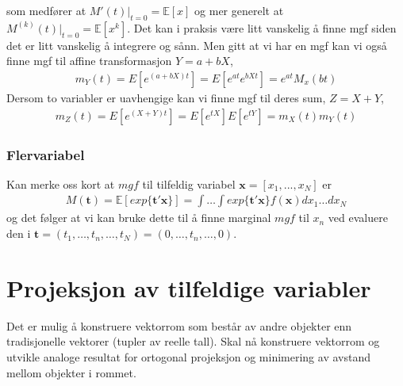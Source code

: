 som medfører at $M'(t)|_{t=0}=\mathbb{E}[x]$ og mer generelt at $M^{(k)}(t)|_{t=0}=\mathbb{E}[x^k]$. Det kan i praksis være litt vanskelig å finne mgf siden det er litt vanskelig å integrere og sånn. Men gitt at vi har en mgf kan vi også finne mgf til affine transformasjon $Y = a + bX$,
\begin{align}
m_Y(t) = E[e^{(a+bX)t}]=E[e^{at}e^{bXt}] = e^{at}M_x(bt)
\end{align}
Dersom to variabler er uavhengige kan vi finne mgf til deres sum, $Z=X+Y$,
\begin{align}
m_Z(t)=E[e^{(X+Y)t}]=E[e^{tX}]E[e^{tY}]=m_X(t)m_Y(t)
\end{align}
\subsubsection{Flervariabel}
Kan merke oss kort at $mgf$ til tilfeldig variabel $\mathbf{x}=[x_1,...,x_N]$ er
\begin{align}
M(\mathbf{t})=\mathbb{E}[exp\{\mathbf{t}'\mathbf{x}\}] = \int\dots\int exp\{\mathbf{t}'\mathbf{x}\}f(\mathbf{x})dx_1\dots dx_N
\end{align}
og det følger at vi kan bruke dette til å finne marginal $mgf$ til $x_n$ ved evaluere den i $\mathbf{t}=(t_1,\dots,t_n,\dots,t_N) = (0,\dots,t_n,\dots,0)$.
\section{Projeksjon av tilfeldige variabler}
Det er mulig å konstruere vektorrom som består av andre objekter enn tradisjonelle vektorer (tupler av reelle tall). Skal nå konstruere vektorrom og utvikle analoge resultat for ortogonal projeksjon og minimering av avstand mellom objekter i rommet.

